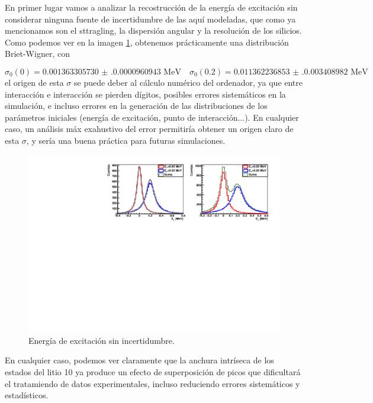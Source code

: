 En primer lugar vamos a analizar la recostrucción de la energía de excitación sin considerar ninguna fuente de incertidumbre de las aquí modeladas, que como ya mencionamos son el sttragling, la dispersión angular y la resolución de los silicios. Como podemos ver en la imagen \cref{Fig:05-RecExcIdx3}, obtenemos prácticamente una distribución Briet-Wigner, con 

\begin{equation}
    \sigma_{0} (0) = \num{0.001363305730(0.0000960943)} \text{ MeV} \quad 
    \sigma_{0} (0.2) = \num{0.011362236853(0.0034089820)} \text{ MeV}
\end{equation} 
el origen de esta $\sigma$ se puede deber al cálculo numérico del ordenador, ya que entre interacción e interacción se pierden dígitos, posibles errores sistemáticos en la simulación, e incluso errores en la generación de las distribuciones de los parámetros iniciales (energía de excitación, punto de interacción...). En cualquier caso, un análisis máx exahustivo del error permitiría obtener un origen claro de esta $\sigma$, y sería una buena práctica para futuras simulaciones.

\vspace*{-0.25cm}
\begin{figure}[H]
    \centering
    \includegraphics[width=1\textwidth]{Imagenes/Rec_incIdx3_single.pdf}
    \caption{Energía de excitación sin incertidumbre.}
    \label{Fig:05-RecExcIdx3}
\end{figure}

En cualquier caso, podemos ver claramente que la anchura intríseca de los estados del litio 10 ya produce un efecto de superposición de picos que dificultará el tratamiendo de datos experimentales, incluso reduciendo errores sistemáticos y estadísticos.


